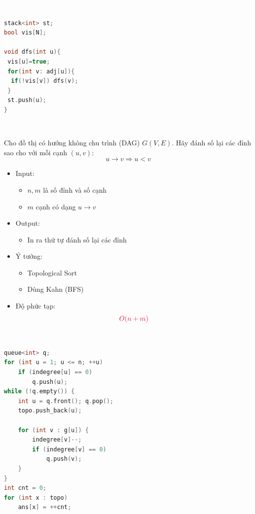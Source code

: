 \documentclass{beamer}
\newcommand{\hlblue}[1]{\textcolor{myblue}{#1}}
\newcommand{\hlgreen}[1]{\textcolor{mygreen}{#1}}
\newcommand{\hlred}[1]{\textcolor{myred}{#1}}
\newcommand{\hlwhite}[1]{\textcolor{white}{#1}}
\begin{document}
\begin{frame}[fragile]{\hlwhite{Code DFS}}
\begin{lstlisting}[language=C++]
stack<int> st;
bool vis[N];

void dfs(int u){
 vis[u]=true;
 for(int v: adj[u]){
  if(!vis[v]) dfs(v);
 }
 st.push(u);
}
\end{lstlisting}
\end{frame}


\begin{frame}{\hlwhite{Ví dụ 1 - Sắp xếp TOPO}}
\begin{tcolorbox}[title=\textbf{\hlwhite{Đề bài}}]
Cho đồ thị có hướng không chu trình (DAG) $G(V, E)$.  
Hãy đánh số lại các đỉnh sao cho với mỗi cạnh $(u, v)$:
\[
u \rightarrow v \Rightarrow u < v
\]
\end{tcolorbox}

\begin{itemize}
\item Input:
\begin{itemize}
\item $n, m$ là số đỉnh và số cạnh
\item $m$ cạnh có dạng $u \rightarrow v$
\end{itemize}

\item Output:
\begin{itemize}
\item In ra thứ tự đánh số lại các đỉnh
\end{itemize}

\item Ý tưởng:
\begin{itemize}
\item \hlblue{Topological Sort}
\item Dùng \hlgreen{Kahn (BFS)}
\end{itemize}

\item Độ phức tạp:
\[
\hlred{O(n + m)}
\]
\end{itemize}
\end{frame}


\begin{frame}[fragile]{\hlwhite{Code - Kahn (Core Idea)}}
\begin{lstlisting}[language=C++]
queue<int> q;
for (int u = 1; u <= n; ++u)
    if (indegree[u] == 0)
        q.push(u);
while (!q.empty()) {
    int u = q.front(); q.pop();
    topo.push_back(u);

    for (int v : g[u]) {
        indegree[v]--;
        if (indegree[v] == 0)
            q.push(v);
    }
}
int cnt = 0;
for (int x : topo)
    ans[x] = ++cnt;
\end{lstlisting}

\vspace{0.2cm}
\centering
\end{frame}
\end{document}
